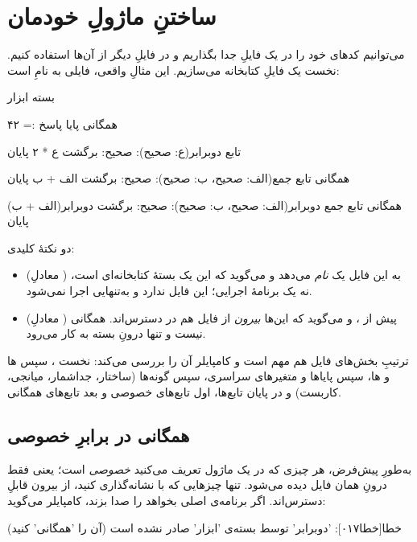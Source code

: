 \section{ساختنِ ماژولِ خودمان}

می‌توانیم کدهای خود را در یک فایلِ جدا بگذاریم و در فایلِ دیگر از آن‌ها استفاده
کنیم. نخست یک فایلِ کتابخانه می‌سازیم. این مثالِ واقعی، فایلی به نامِ
 است:

\begin{salamfa}
بسته ابزار

همگانی پایا پاسخ := ۴۲

تابع دوبرابر(ع: صحیح): صحیح:
    برگشت ع * ۲
پایان

همگانی تابع جمع(الف: صحیح، ب: صحیح): صحیح:
    برگشت الف + ب
پایان

همگانی تابع جمع دوبرابر(الف: صحیح، ب: صحیح): صحیح:
    برگشت دوبرابر(الف + ب)
پایان
\end{salamfa}

دو نکتهٔ کلیدی:
\begin{itemize}
  \item {} (معادلِ ) به این فایل یک \emph{نام}
        می‌دهد و می‌گوید که این یک بستهٔ کتابخانه‌ای است، نه یک برنامهٔ اجرایی؛
        این فایل  ندارد و به‌تنهایی اجرا نمی‌شود.
  \item {} (معادلِ ) پیش از ،
         و  می‌گوید که این‌ها
        \emph{بیرون} از فایل هم در دسترس‌اند.  همگانی نیست و تنها
        درونِ بسته به کار می‌رود.
\end{itemize}

ترتیبِ بخش‌های فایل هم مهم است و کامپایلر آن را بررسی می‌کند: نخست ،
سپس ها و ها، سپس پایاها و متغیرهای سراسری، سپس
گونه‌ها (ساختار، جداشمار، میانجی، کاربست) و در پایان تابع‌ها، اول تابع‌های
خصوصی و بعد تابع‌های همگانی.

\subsection{همگانی در برابرِ خصوصی}

به‌طورِ پیش‌فرض، هر چیزی که در یک ماژول تعریف می‌کنید \emph{خصوصی} است؛ یعنی
فقط درونِ همان فایل دیده می‌شود. تنها چیزهایی که با  نشانه‌گذاری
کنید، از بیرون قابلِ دسترس‌اند. اگر برنامه‌ی اصلی بخواهد 
را صدا بزند، کامپایلر می‌گوید:

\begin{progoutfa}
خطا[خطا۰۱۷]: 'دوبرابر' توسط بسته‌ی 'ابزار' صادر نشده است (آن را 'همگانی' کنید)
\end{progoutfa}

